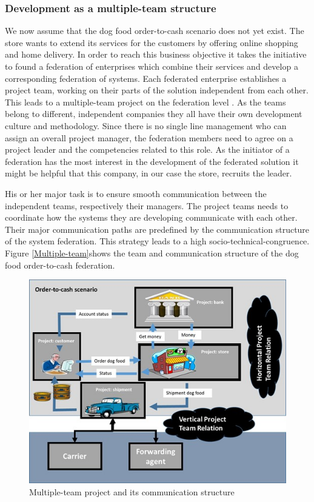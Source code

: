 \subsubsection{Development as a multiple-team structure}
We now assume that the dog food order-to-cash scenario does not yet exist. The store wants to extend its services for the customers by offering online shopping and home delivery. In order to reach this business objective it takes the initiative to found a federation of enterprises which combine their services and develop a corresponding federation of systems.
Each federated enterprise establishes a project team, working on their parts of the solution independent from each other. This leads to a multiple-team project on the federation level \cite{book:OrgPatternsAgile}. As the teams belong to different, independent companies they all have their own development culture and methodology.
Since there is no single line management who can assign an overall project manager, the federation members need to agree on a project leader and the competencies related to this role. As the initiator of a federation has the most interest in the development of the federated solution it might be helpful that this company, in our case the store, recruits the leader.

His or her major task is to ensure smooth communication between the independent teams, respectively their managers. The project teams needs to coordinate how the systems they are developing communicate with each other. Their major communication paths are predefined by the communication structure of the system federation. This strategy leads to a high socio-technical-congruence. Figure \ref{Multiple-team}shows the team and communication structure of the dog food order-to-cash federation.

\begin{figure}[htbp]
	\centering
	\includegraphics[width=0.6\linewidth] {Figures/Chapter5/Project/MultipleTeam.jpg}
	\caption[Multiple-team project and its communication structure]{Multiple-team project and its communication structure}
	\label{fig:Multiple-team}
\end{figure}

